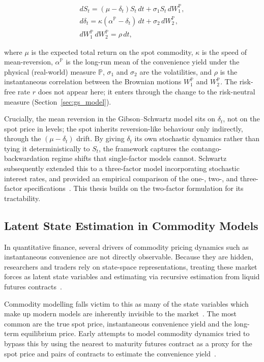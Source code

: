 \documentclass[11pt, a4paper]{article}
\begin{document}
\begin{gather} \label{eq: gibson_schwartz_physical}
dS_t = (\mu-\delta_t)S_t\,dt + \sigma_1 S_t\, dW_1^{\mathbb{P}}, \label{sde1} \\
d\delta_t = \kappa(\alpha^{\mathbb{P}}-\delta_t)\,dt + \sigma_2\, dW_2^{\mathbb{P}}, \label{sde2} \\
dW_1^{\mathbb{P}}\, dW_2^{\mathbb{P}} = \rho\, dt, \label{eq:gs_corr}
\end{gather}

where $\mu$ is the expected total return on the spot commodity, $\kappa$ is the speed of mean-reversion, $\alpha^{\mathbb{P}}$ is the long-run mean of the convenience yield under the physical (real-world) measure $\mathbb{P}$, $\sigma_1$ and $\sigma_2$ are the volatilities, and $\rho$ is the instantaneous correlation between the Brownian motions $W_1^{\mathbb{P}}$ and $W_2^{\mathbb{P}}$. The risk-free rate $r$ does not appear here; it enters through the change to the risk-neutral measure (Section~\ref{sec:gs_model}).

Crucially, the mean reversion in the Gibson–Schwartz model sits on $\delta_t$, not on the spot price in levels; the spot inherits reversion-like behaviour only indirectly, through the $(\mu-\delta_t)$ drift. By giving $\delta_t$ its own stochastic dynamics rather than tying it deterministically to $S_t$, the framework captures the contango-backwardation regime shifts that single-factor models cannot. Schwartz subsequently extended this to a three-factor model incorporating stochastic interest rates, and provided an empirical comparison of the one-, two-, and three-factor specifications~\cite{Schwartz1997TheHedging}. This thesis builds on the two-factor formulation for its tractability.

\subsection{Latent State Estimation in Commodity Models}
\label{sec:lit_estimation}

In quantitative finance, several drivers of commodity pricing dynamics such as instantaneous convenience are not directly observable. Because they are hidden, researchers and traders rely on state-space representations, treating these market forces as latent state variables and estimating via recursive 
estimation from liquid futures contracts~\cite{Ribeiro2004A}.


Commodity modelling falls victim to this as many of the state variables which make up modern models are inherently invisible to the market~\cite{Ribeiro2004A}. The most common are the true spot price, instantaneous convenience yield and the long-term equilibrium price. Early attempts to model commodity dynamics tried to bypass this by using the nearest to maturity futures contract as a proxy for the spot price and pairs of contracts to estimate the convenience yield~\cite{Schwartz1997TheHedging}.
\end{document}

